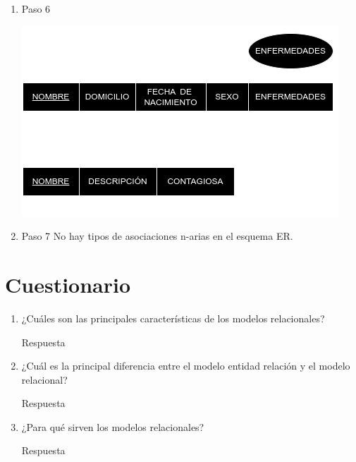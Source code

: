 \documentclass[a4paper,12pt]{article}
\begin{document}
\begin{enumerate}
  \item[] Paso 6
  
  \begin{center}
    \includegraphics[scale = .5]{IMA/E2P6.png}
  \end{center}

  \item[] Paso 7
  \thispagestyle{fancy} %
  No hay tipos de asociaciones n-arias en el esquema ER.

\end{enumerate}


\thispagestyle{fancy} %
\section*{Cuestionario}
\begin{enumerate}
    \item \textcolor{sun}{¿Cuáles son las principales características de los modelos relacionales?} 

    \textcolor{water}{Respuesta}   

    \item \textcolor{sun}{¿Cuál es la principal diferencia entre el modelo entidad relación y el modelo relacional? } 

    \textcolor{water}{Respuesta}   

    \item \textcolor{sun}{¿Para qué sirven los modelos relacionales?} 

    \textcolor{water}{Respuesta}   
    \thispagestyle{fancy} %
\end{enumerate}







\end{document}
